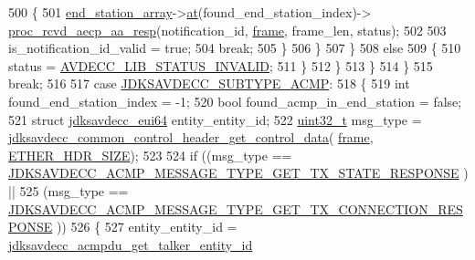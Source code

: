 \begin{DoxyCode}
{500                         \{
501                             \hyperlink{classavdecc__lib_1_1controller__imp_a17c6518dbb728acdcd1c4e78d7bc1c5a}{end\_station\_array}->\hyperlink{classavdecc__lib_1_1end__stations_a8b2053474417f106d063017c5b60bad2}{at}(found\_end\_station\_index)->
      \hyperlink{classavdecc__lib_1_1end__station__imp_a2848ff48c874f56127a2bdc16f186010}{proc\_rcvd\_aecp\_aa\_resp}(notification\_id, \hyperlink{gst__avb__playbin_8c_ac8e710e0b5e994c0545d75d69868c6f0}{frame}, frame\_len, status);
502 
503                             is\_notification\_id\_valid = \textcolor{keyword}{true};
504                             \textcolor{keywordflow}{break};
505                         \}
506                         \}
507                     \}
508                     \textcolor{keywordflow}{else}
509                     \{
510                         status = \hyperlink{namespaceavdecc__lib_affd436edb2cecd20cfd784a84f852b2ba8a4a3486ee32871689aae7049d91ac0c}{AVDECC\_LIB\_STATUS\_INVALID};
511                     \}
512                 \}
513             \}
514         \}
515         \textcolor{keywordflow}{break};
516 
517         \textcolor{keywordflow}{case} \hyperlink{group__subtype_gadcdd50d34325df28c29ca6249a4c307e}{JDKSAVDECC\_SUBTYPE\_ACMP}:
518         \{
519             \textcolor{keywordtype}{int} found\_end\_station\_index = -1;
520             \textcolor{keywordtype}{bool} found\_acmp\_in\_end\_station = \textcolor{keyword}{false};
521             \textcolor{keyword}{struct }\hyperlink{structjdksavdecc__eui64}{jdksavdecc\_eui64} entity\_entity\_id;
522             \hyperlink{parse_8c_a6eb1e68cc391dd753bc8ce896dbb8315}{uint32\_t} msg\_type = 
      \hyperlink{group__jdksavdecc__avtp__common__control__header_gacb435e5d647474931972cb9eb93b4e41}{jdksavdecc\_common\_control\_header\_get\_control\_data}(
      \hyperlink{gst__avb__playbin_8c_ac8e710e0b5e994c0545d75d69868c6f0}{frame}, \hyperlink{namespaceavdecc__lib_a6c827b1a0d973e18119c5e3da518e65ca9512ad9b34302ba7048d88197e0a2dc0}{ETHER\_HDR\_SIZE});
523 
524             \textcolor{keywordflow}{if} ((msg\_type == \hyperlink{group__acmp__message__type_gaf9b24b0190d5bf9cae7e37c4a31cda12}{JDKSAVDECC\_ACMP\_MESSAGE\_TYPE\_GET\_TX\_STATE\_RESPONSE}
      ) ||
525                 (msg\_type == 
      \hyperlink{group__acmp__message__type_gac8d2fee5822f733200680da98472958f}{JDKSAVDECC\_ACMP\_MESSAGE\_TYPE\_GET\_TX\_CONNECTION\_RESPONSE}
      ))
526             \{
527                 entity\_entity\_id = \hyperlink{group__acmpdu_ga9efe0b94b146760a8849d872d2a00da7}{jdksavdecc\_acmpdu\_get\_talker\_entity\_id}
}
\end{DoxyCode}
